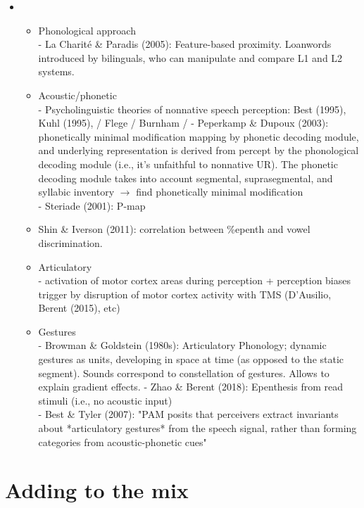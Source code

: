 {\begin{itemize}
  \item
  \begin{itemize}
  \item Phonological approach \\
    - La Charité \& Paradis (2005): Feature-based proximity. Loanwords introduced by bilinguals, who can manipulate and compare L1 and L2 systems. \\
  \item Acoustic/phonetic \\
    - Psycholinguistic theories of nonnative speech perception: Best (1995), Kuhl (1995), / Flege / Burnham /  
    - Peperkamp \& Dupoux (2003): phonetically minimal modification mapping by phonetic decoding module, and underlying representation is derived from percept by the phonological decoding module (i.e., it's unfaithful to nonnative UR). The phonetic decoding module takes into account segmental, suprasegmental, and syllabic inventory $\rightarrow$ find phonetically minimal modification \\
    - Steriade (2001): P-map
  \item Shin \& Iverson (2011): correlation between \%epenth and vowel discrimination.   
  \item Articulatory \\
    - activation of motor cortex areas during perception + perception biases trigger by disruption of motor cortex activity with TMS (D'Ausilio, Berent (2015), etc)
  \item Gestures \\
    - Browman \& Goldstein (1980s): Articulatory Phonology; dynamic gestures as units, developing in space at time (as opposed to the static segment). Sounds correspond to constellation of gestures. Allows to explain gradient effects.  
    - Zhao \& Berent (2018): Epenthesis from read stimuli (i.e., no acoustic input) \\
    - Best \& Tyler (2007): "PAM posits that perceivers extract invariants about *articulatory gestures* from the speech signal, rather than forming categories from acoustic-phonetic cues"
  \end{itemize}
\end{itemize}

\section{Adding to the mix}  
 
}
